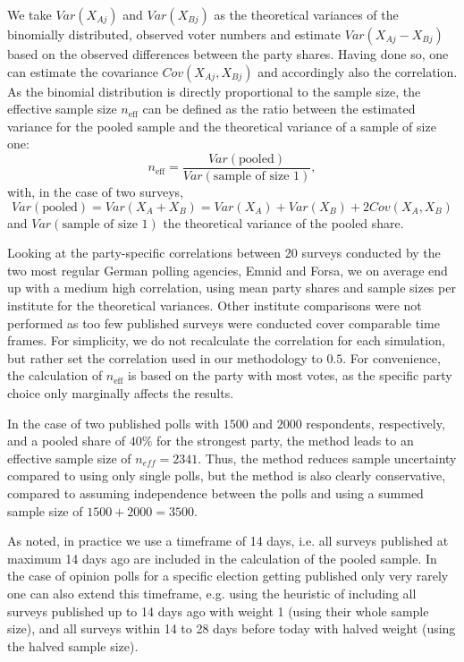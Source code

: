 \documentclass[smallcondensed]{svjour3}     %
\begin{document}
We take $Var(X_{Aj})$ and $Var(X_{Bj})$ as the theoretical variances of the binomially distributed, observed voter numbers and estimate $Var(X_{Aj} - X_{Bj})$ based on the observed differences between the party shares. Having done so, one can estimate the covariance $Cov(X_{Aj}, X_{Bj})$ and accordingly also the correlation. As the binomial distribution is directly proportional to the sample size, the effective sample size $n_{\text{eff}}$ can be defined as the ratio between the estimated variance for the pooled sample and the theoretical variance of a sample of size one:
$$
n_{\text{eff}} = \frac{Var(\text{pooled})}{Var(\text{sample of size 1})},
$$
with, in the case of two surveys,
$$
Var(\text{pooled}) = Var(X_A + X_B) = Var(X_A) + Var(X_B) + 2 Cov(X_A,X_B)
$$
and $Var(\text{sample of size 1})$ the theoretical variance of the pooled share.

Looking at the party-specific correlations between 20 surveys conducted by the two most regular German polling agencies, Emnid and Forsa, we on average end up with a medium high correlation, using mean party shares and sample sizes per institute for the theoretical variances. Other institute comparisons were not performed as too few published surveys were conducted cover comparable time frames. For simplicity, we do not recalculate the correlation for each simulation, but rather set the correlation used in our methodology to $0.5$.
For convenience, the calculation of $n_{\text{eff}}$ is based on the party with most votes, as the specific party choice only marginally affects the results.

In the case of two published polls with $1500$ and $2000$ respondents, respectively, and a pooled share of $40\%$
for the strongest party, the method leads
to an effective sample size of $n_{eff} = 2341$. Thus, the method reduces sample uncertainty
compared to using only single polls, but the method is also clearly conservative, compared to
assuming independence between the polls and using a summed sample size of $1500 + 2000 = 3500$.

As noted, in practice we use a timeframe of 14 days, i.e. all surveys published at maximum 14 days ago are included
in the calculation of the pooled sample. In the case of opinion polls for a specific election getting published
only very rarely one can also extend this timeframe, e.g. using the heuristic of including all surveys published up to 14 days
ago with weight 1 (using their whole sample size), and all surveys within 14 to 28 days before today with halved weight
(using the halved sample size).
\end{document}
